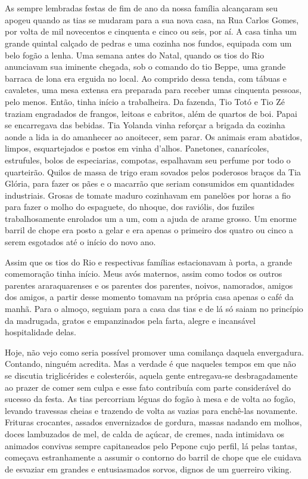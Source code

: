 \chapter{}
As sempre lembradas festas de fim de ano da nossa família alcançaram seu apogeu quando as tias se mudaram para a sua nova casa, na Rua Carlos Gomes, por volta de mil novecentos e cinquenta e cinco ou seis, por aí.
A casa tinha um grande quintal calçado de pedras e uma cozinha nos fundos, equipada com um belo fogão a lenha.
Uma semana antes do Natal, quando os tios do Rio anunciavam sua iminente chegada, sob o comando do tio Beppe, uma grande barraca de lona era erguida no local.
Ao comprido dessa tenda, com tábuas e cavaletes, uma mesa extensa era preparada para receber umas cinquenta pessoas, pelo menos.
Então, tinha início a trabalheira.
Da fazenda, Tio Totó e Tio Zé traziam engradados de frangos, leitoas e cabritos, além de quartos de boi.
Papai se encarregava das bebidas.
Tia Yolanda vinha reforçar a brigada da cozinha aonde a lida ia do amanhecer ao anoitecer, sem parar.
Os animais eram abatidos, limpos, esquartejados e postos em vinha d’alhos.
Panetones, canarícoles, estrufules, bolos de especiarias, compotas, espalhavam seu perfume por todo o quarteirão.
Quilos de massa de trigo eram sovados pelos poderosos braços da Tia Glória, para fazer os pães e o macarrão que seriam consumidos em quantidades industriais.
Grosas de tomate maduro cozinhavam em panelões por horas a fio para fazer o molho do espaguete, do nhoque, dos raviólis, dos fuziles trabalhosamente enrolados um a um, com a ajuda de arame grosso.
Um enorme barril de chope era posto a gelar e era apenas o primeiro dos quatro ou cinco a serem esgotados até o início do novo ano.

Assim que os tios do Rio e respectivas famílias estacionavam à porta, a grande comemoração tinha início.
Meus avós maternos, assim como todos os outros parentes araraquarenses e os parentes dos parentes, noivos, namorados, amigos dos amigos, a partir desse momento tomavam na própria casa apenas o café da manhã.
Para o almoço, seguiam para a casa das tias e de lá só saiam no princípio da madrugada, gratos e empanzinados pela farta, alegre e incansável hospitalidade delas.

Hoje, não vejo como seria possível promover uma comilança daquela envergadura.
Contando, ninguém acredita.
Mas a verdade é que naqueles tempos em que não se discutia triglicérides e colesteróis, aquela gente entregava-se desbragadamente ao prazer de comer sem culpa e esse fato contribuía com parte considerável do sucesso da festa.
As tias percorriam léguas do fogão à mesa e de volta ao fogão, levando travessas cheias e trazendo de volta as vazias para enchê-las novamente.
Frituras crocantes, assados envernizados de gordura, massas nadando em molhos, doces lambuzados de mel, de calda de açúcar, de cremes, nada intimidava os animados convivas sempre capitaneados pelo Pepone cujo perfil, lá pelas tantas, começava estranhamente a assumir o contorno do barril de chope que ele cuidava de esvaziar em grandes e entusiasmados sorvos, dignos de um guerreiro viking.


